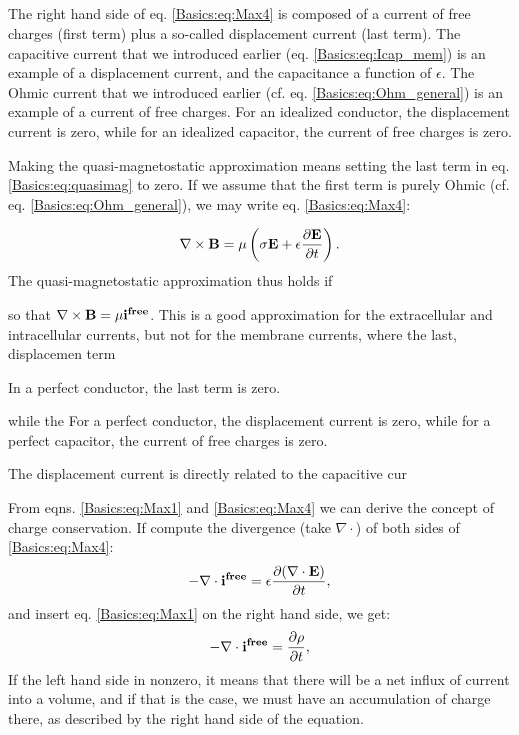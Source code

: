 \subsection{}
The right hand side of eq. \ref{Basics:eq:Max4} is composed of a current of free charges (first term) plus a so-called displacement current (last term). The capacitive current that we introduced earlier (eq. \ref{Basics:eq:Icap_mem}) is an example of a displacement current, and the capacitance a function of $\epsilon$. The Ohmic current that we introduced earlier (cf. eq. \ref{Basics:eq:Ohm_general}) is an example of a current of free charges. For an idealized conductor, the displacement current is zero, while for an idealized capacitor, the current of free charges is zero. 

Making the quasi-magnetostatic approximation means setting the last term in eq. \ref{Basics:eq:quasimag} to zero. If we assume that the first term is purely Ohmic (cf. eq. \ref{Basics:eq:Ohm_general}), we may write eq. \ref{Basics:eq:Max4}:

\begin{equation}
\nabla \times {\bf B}  =  \mu \left( \sigma {\bf E} + \epsilon\frac{\partial {\bf E}}{\partial t} \right). 
\label{Basics:eq:quasimag}
\end{equation}
The quasi-magnetostatic approximation thus holds if 


so that $\nabla \times {\bf B}  =  \mu\bf{i^{free}}$. This is a good approximation for the extracellular and intracellular currents, but not for the membrane currents, where the last, displacemen term


In a perfect conductor, the last term is zero. 



 while the 
For a perfect conductor, the displacement current is zero, while for a perfect capacitor, the current of free charges is zero. 

The displacement current is directly related to the capacitive cur





From eqns. \ref{Basics:eq:Max1} and  \ref{Basics:eq:Max4} we can derive the concept of charge conservation. If compute the divergence (take $\nabla \cdot$) of both sides of \ref{Basics:eq:Max4}:
\begin{equation}
- \nabla \cdot {\bf i^{free}} =  \epsilon \frac{\partial (\nabla \cdot {\bf E})}{\partial t}, 
\label{Basics:eq:Max4dot}
\end{equation}
and insert eq. \ref{Basics:eq:Max1} on the right hand side, we get:
\begin{equation}
- \nabla \cdot {\bf i^{free}} =  \frac{\partial \rho}{\partial t},
\label{Basics:eq:Max4dot1}
\end{equation}
If the left hand side in nonzero, it means that there will be a net influx of current into a volume, and if that is the case, we must have an accumulation of charge there, as described by the right hand side of the equation. 




